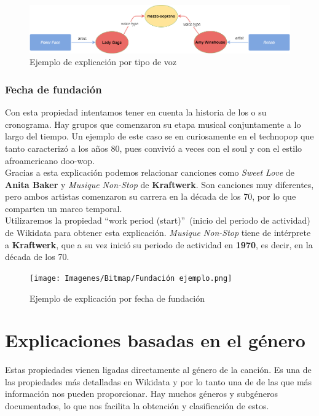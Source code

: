 \begin{figure}[h!]
	\centering
	\includegraphics[width = 1\textwidth]{Imagenes/Bitmap/Voz ejemplo.png}
	\caption{Ejemplo de explicación por tipo de voz}
	\label{fig:sampleImage}
\end{figure}

\subsubsection*{Fecha de fundación}

Con esta propiedad intentamos tener en cuenta la historia de los o su cronograma. Hay grupos que comenzaron su etapa musical  conjuntamente a lo largo del tiempo. Un ejemplo de este caso se en curiosamente en el technopop que tanto caracterizó a los años 80, pues convivió a veces con el soul y con el estilo afroamericano doo-wop.\\

Gracias a esta explicación podemos relacionar canciones como \textit{Sweet Love} de \textbf{Anita Baker} y \textit{Musique Non-Stop} de \textbf{Kraftwerk}. Son canciones muy diferentes, pero ambos artistas comenzaron su carrera en la década de los 70, por lo que comparten un marco temporal.\\

Utilizaremos la propiedad ``work period (start)''~(inicio del periodo de actividad) de Wikidata para obtener esta explicación. \textit{Musique Non-Stop} tiene de intérprete a \textbf{Kraftwerk}, que a su vez inició su periodo de actividad en \textbf{1970}, es decir, en la década de los 70.\\

\begin{figure}[h!]
	\centering
	\texttt{[image: Imagenes/Bitmap/Fundación ejemplo.png]}
	\caption{Ejemplo de explicación por fecha de fundación}
	\label{fig:sampleImage}
\end{figure}

\section{Explicaciones basadas en el género}

Estas propiedades vienen ligadas directamente al género de la canción. Es una de las propiedades más detalladas en Wikidata y por lo tanto una de de las que más información nos pueden proporcionar. Hay muchos géneros y subgéneros documentados, lo que nos facilita la obtención y clasificación de estos.\\


